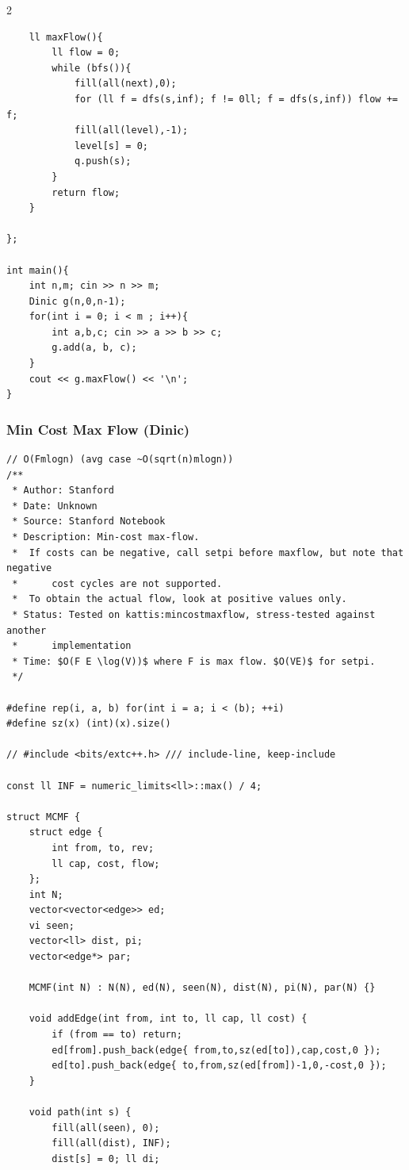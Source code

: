 \documentclass[twoside]{article}
\begin{document}
\begin{multicols*}{2}
\begin{verbatim}
    ll maxFlow(){
        ll flow = 0;
        while (bfs()){
            fill(all(next),0);
            for (ll f = dfs(s,inf); f != 0ll; f = dfs(s,inf)) flow += f;
            fill(all(level),-1); 
            level[s] = 0;
            q.push(s);
        }
        return flow;
    }

};

int main(){
    int n,m; cin >> n >> m;
    Dinic g(n,0,n-1);
    for(int i = 0; i < m ; i++){
        int a,b,c; cin >> a >> b >> c;
        g.add(a, b, c);
    }
    cout << g.maxFlow() << '\n';
}

\end{verbatim}

	{
		\subsubsection*{Min Cost Max Flow (Dinic)}
	}
	\begin{verbatim}
// O(Fmlogn) (avg case ~O(sqrt(n)mlogn))
/**
 * Author: Stanford
 * Date: Unknown
 * Source: Stanford Notebook
 * Description: Min-cost max-flow.
 *  If costs can be negative, call setpi before maxflow, but note that negative
 *      cost cycles are not supported.
 *  To obtain the actual flow, look at positive values only.
 * Status: Tested on kattis:mincostmaxflow, stress-tested against another
 *      implementation
 * Time: $O(F E \log(V))$ where F is max flow. $O(VE)$ for setpi.
 */

#define rep(i, a, b) for(int i = a; i < (b); ++i)
#define sz(x) (int)(x).size()

// #include <bits/extc++.h> /// include-line, keep-include

const ll INF = numeric_limits<ll>::max() / 4;

struct MCMF {
	struct edge {
		int from, to, rev;
		ll cap, cost, flow;
	};
	int N;
	vector<vector<edge>> ed;
	vi seen;
	vector<ll> dist, pi;
	vector<edge*> par;

	MCMF(int N) : N(N), ed(N), seen(N), dist(N), pi(N), par(N) {}

	void addEdge(int from, int to, ll cap, ll cost) {
		if (from == to) return;
		ed[from].push_back(edge{ from,to,sz(ed[to]),cap,cost,0 });
		ed[to].push_back(edge{ to,from,sz(ed[from])-1,0,-cost,0 });
	}

	void path(int s) {
		fill(all(seen), 0);
		fill(all(dist), INF);
		dist[s] = 0; ll di;


\end{verbatim}
\end{multicols*}
\end{document}
